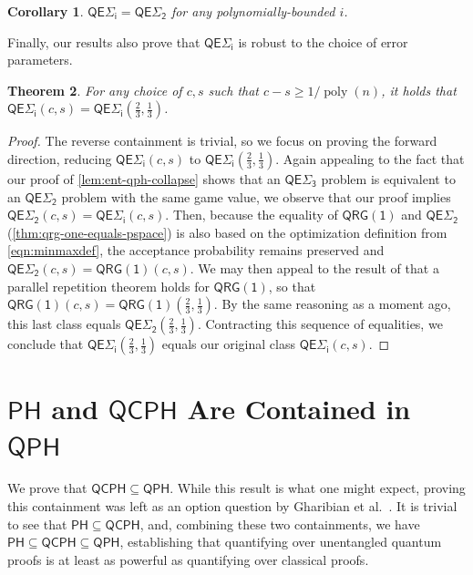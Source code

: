 \documentclass[11pt]{article}
\newtheorem{theorem}{Theorem}[section]
\newtheorem{corollary}[theorem]{Corollary}
\theoremstyle{definition}
\DeclareMathOperator{\poly}{poly}
\newcommand{\class}[1]{\ensuremath{\mathsf{#1}}\xspace}
\newcommand{\QRGk}[1][k]{\class{QRG(#1)}}
\newcommand{\QRGone}{\QRGk[1]}
\newcommand{\PH}{\class{PH}}
\newcommand{\QCPH}{\class{QCPH}}
\newcommand{\QPH}{\class{QPH}}
\newcommand{\entQSigmai}[1][i]{\class{QE\Sigma_{#1}}}
\begin{document}
\begin{corollary}\label{corr:entQSigmaPoly=2}
    $\entQSigmai[i] = \entQSigmai[2]$ for any polynomially-bounded $i$.
\end{corollary}

Finally, our results also prove that $\entQSigmai$ is robust to the choice of error parameters.

\begin{theorem}\label{thm:entqsigmaerror}
    For any choice of $c,s$ such that $c-s\geq 1/\poly(n)$, it holds that $\entQSigmai[i]\left(c,s\right) = \entQSigmai[i]\left(\tfrac{2}{3},\tfrac{1}{3}\right)$.
\end{theorem}
\begin{proof}
    The reverse containment is trivial, so we focus on proving the forward direction, reducing $\entQSigmai[i]\left(c,s\right)$ to $ \entQSigmai[i]\left(\tfrac{2}{3},\tfrac{1}{3}\right)$.
    Again appealing to the fact that our proof of \cref{lem:ent-qph-collapse} shows that an $\entQSigmai[3]$ problem is equivalent to an $\entQSigmai[2]$ problem with the same game value, we observe that our proof implies $\entQSigmai[2](c,s)=\entQSigmai[i](c,s)$.
    Then, because the equality of $\QRGone$ and $\entQSigmai[2]$
    (\cref{thm:qrg-one-equals-pspace}) is also based on the optimization definition from \cref{eqn:minmaxdef}, the acceptance probability remains preserved and $\entQSigmai[2](c,s)=\QRGone(c,s)$. We may then appeal to the result of \cite{gutoski2005qrg} that a parallel repetition theorem holds for $\QRGone$, so that $\QRGone(c,s)=\QRGone\left(\tfrac{2}{3},\tfrac{1}{3}\right)$.
    By the same reasoning as a moment ago, this last class equals $\entQSigmai[2]\left(\tfrac{2}{3},\tfrac{1}{3}\right)$.
    Contracting this sequence of equalities, we conclude that $\entQSigmai[i]\left(\tfrac{2}{3},\tfrac{1}{3}\right)$ equals our original class $\entQSigmai[i](c,s)$.
\end{proof}




\section{\texorpdfstring{$\PH$ and $\QCPH$ Are Contained in $\QPH$}{PH and QCPH Are Contained in prodQPH}}\label{sec:direct-proof-ph-prodqph}

We prove that $\QCPH \subseteq \QPH$. 
While this result is what one might expect, proving this containment was left as an option question by Gharibian et al.\ \cite{GSSSY22_qph}.
It is trivial to see that $\PH \subseteq \QCPH$, and, combining these two containments, we have $\PH \subseteq \QCPH \subseteq \QPH$, establishing that quantifying over unentangled quantum proofs is at least as powerful as quantifying over classical proofs. 
\end{document}
